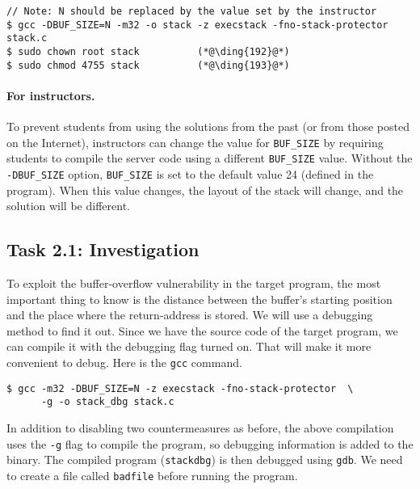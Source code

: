 \begin{lstlisting}
// Note: N should be replaced by the value set by the instructor
$ gcc -DBUF_SIZE=N -m32 -o stack -z execstack -fno-stack-protector stack.c
$ sudo chown root stack          (*@\ding{192}@*)
$ sudo chmod 4755 stack          (*@\ding{193}@*)
\end{lstlisting}
 

\paragraph{For instructors.}
To prevent students from using the solutions from the past (or from those
posted on the Internet), instructors can change the
value for \texttt{BUF\_SIZE} by requiring students to compile the
server code using a different \texttt{BUF\_SIZE} value.
Without the \texttt{-DBUF\_SIZE}
option, \texttt{BUF\_SIZE} is set to the default value 24 (defined
in the program).
When this value changes, the layout of the stack
will change, and the solution will be different.


\subsection{Task 2.1: Investigation} 

To exploit the buffer-overflow vulnerability in the target program,
the most important thing to know is the distance between the 
buffer's starting position and the place where the return-address
is stored. We will use a debugging method to find it out.
Since we have the source code of the target program, we
can compile it with the debugging flag turned on. That will make it more
convenient to debug. Here is the \texttt{gcc} command.

\begin{lstlisting}
$ gcc -m32 -DBUF_SIZE=N -z execstack -fno-stack-protector  \
      -g -o stack_dbg stack.c
\end{lstlisting}

In addition to disabling two countermeasures as before, the above compilation
uses the \texttt{-g} flag to compile the program, so debugging information
is added to the binary.  The compiled program (\texttt{stack\textunderscore dbg}) is
then debugged using \texttt{gdb}. We need to create a file called
\texttt{badfile} before running the program. 

